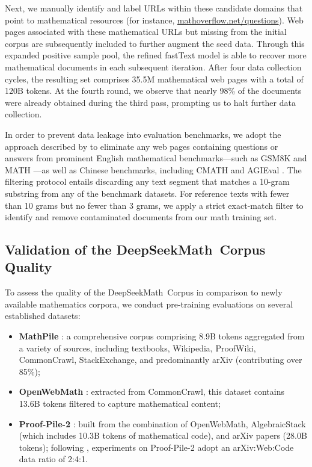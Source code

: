 Next, we manually identify and label URLs within these candidate domains that point to mathematical resources (for instance, \url{mathoverflow.net/questions}). Web pages associated with these mathematical URLs but missing from the initial corpus are subsequently included to further augment the seed data. Through this expanded positive sample pool, the refined fastText model is able to recover more mathematical documents in each subsequent iteration. After four data collection cycles, the resulting set comprises 35.5M mathematical web pages with a total of 120B tokens. At the fourth round, we observe that nearly 98\% of the documents were already obtained during the third pass, prompting us to halt further data collection.

In order to prevent data leakage into evaluation benchmarks, we adopt the approach described by \cite{deepseek-coder} to eliminate any web pages containing questions or answers from prominent English mathematical benchmarks—such as GSM8K \citep{gsm8k} and MATH \citep{MATH}—as well as Chinese benchmarks, including CMATH \citep{wei2023cmath} and AGIEval \citep{agieval}. The filtering protocol entails discarding any text segment that matches a 10-gram substring from any of the benchmark datasets. For reference texts with fewer than 10 grams but no fewer than 3 grams, we apply a strict exact-match filter to identify and remove contaminated documents from our math training set.

\subsection{Validation of the DeepSeekMath~Corpus Quality}

To assess the quality of the DeepSeekMath~Corpus in comparison to newly available mathematics corpora, we conduct pre-training evaluations on several established datasets:

\begin{itemize}[topsep=0pt]
    \item \textbf{MathPile} \citep{mathpile}: a comprehensive corpus comprising 8.9B tokens aggregated from a variety of sources, including textbooks, Wikipedia, ProofWiki, CommonCrawl, StackExchange, and predominantly arXiv (contributing over 85\%);
    \item \textbf{OpenWebMath} \citep{openwebmath}: extracted from CommonCrawl, this dataset contains 13.6B tokens filtered to capture mathematical content;
    \item \textbf{Proof-Pile-2} \citep{llemma}: built from the combination of OpenWebMath, AlgebraicStack (which includes 10.3B tokens of mathematical code), and arXiv papers (28.0B tokens); following \cite{llemma}, experiments on Proof-Pile-2 adopt an arXiv:Web:Code data ratio of 2:4:1.
\end{itemize}

